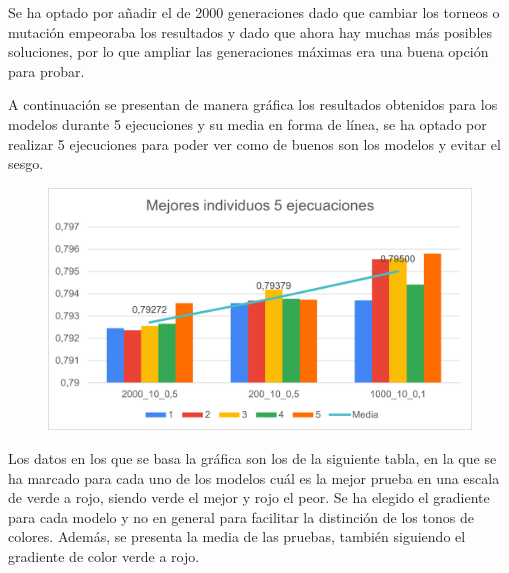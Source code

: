 \documentclass[12pt, spanish, pdftex]{UC3M_document}
\begin{document}
Se ha optado por añadir el de 2000 generaciones dado que cambiar los torneos o mutación empeoraba los resultados y dado que ahora hay muchas más posibles soluciones, por lo que ampliar las generaciones máximas era una buena opción para probar.

A continuación se presentan de manera gráfica los resultados obtenidos para los modelos durante 5 ejecuciones y su media en forma de línea, se ha optado por realizar 5 ejecuciones para poder ver como de buenos son los modelos y evitar el sesgo.
\begin{figure}[H]
	{\includegraphics[scale=1]{./img/geneticAmpliation.png}}
\end{figure}
Los datos en los que se basa la gráfica son los de la siguiente tabla, en la que se ha marcado para cada uno de los modelos cuál es la mejor prueba en una escala de verde a rojo, siendo verde el mejor y rojo el peor. Se ha elegido el gradiente para cada modelo y no en general para facilitar la distinción de los tonos de colores. Además, se presenta la media de las pruebas, también siguiendo el gradiente de color verde a rojo.
\end{document}

